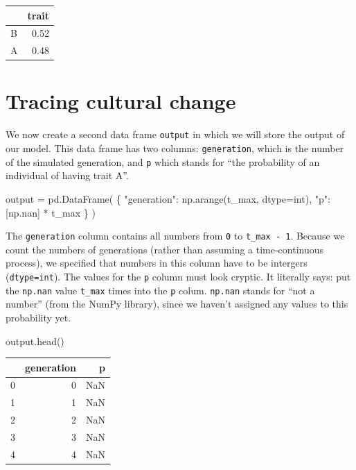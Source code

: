 \documentclass[
  a4paperpaper,
  ,captions=tableheading
]{scrbook}
\newenvironment{Shaded}{\begin{snugshade}}{\end{snugshade}}
\newcommand{\BuiltInTok}[1]{\textcolor[rgb]{0.00,0.23,0.31}{#1}}
\newcommand{\NormalTok}[1]{\textcolor[rgb]{0.00,0.23,0.31}{#1}}
\newcommand{\OperatorTok}[1]{\textcolor[rgb]{0.37,0.37,0.37}{#1}}
\newcommand{\StringTok}[1]{\textcolor[rgb]{0.13,0.47,0.30}{#1}}
\begin{document}
\begin{tabular}{lr}
\toprule
{} &  trait \\
\midrule
B &   0.52 \\
A &   0.48 \\
\bottomrule
\end{tabular}

\hypertarget{tracing-cultural-change}{%
\section{Tracing cultural change}\label{tracing-cultural-change}}

We now create a second data frame \texttt{output} in which we will store
the output of our model. This data frame has two columns:
\texttt{generation}, which is the number of the simulated generation,
and \texttt{p} which stands for ``the probability of an individual of
having trait A''.

\begin{Shaded}
\begin{Highlighting}[]
\NormalTok{output }\OperatorTok{=}\NormalTok{ pd.DataFrame(}
\NormalTok{    \{}
        \StringTok{"generation"}\NormalTok{: np.arange(t\_max, dtype}\OperatorTok{=}\BuiltInTok{int}\NormalTok{), }
        \StringTok{"p"}\NormalTok{: [np.nan] }\OperatorTok{*}\NormalTok{ t\_max }
\NormalTok{    \}}
\NormalTok{)}
\end{Highlighting}
\end{Shaded}

The \texttt{generation} column contains all numbers from \texttt{0} to
\texttt{t\_max\ -\ 1}. Because we count the numbers of generations
(rather than assuming a time-continuous process), we specified that
numbers in this column have to be intergers (\texttt{dtype=int}). The
values for the \texttt{p} column must look cryptic. It literally says:
put the \texttt{np.nan} value \texttt{t\_max} times into the \texttt{p}
colum. \texttt{np.nan} stands for ``not a number'' (from the NumPy
library), since we haven't assigned any values to this probability yet.

\begin{Shaded}
\begin{Highlighting}[]
\NormalTok{output.head()}
\end{Highlighting}
\end{Shaded}

\begin{tabular}{lrr}
\toprule
{} &  generation &   p \\
\midrule
0 &           0 & NaN \\
1 &           1 & NaN \\
2 &           2 & NaN \\
3 &           3 & NaN \\
4 &           4 & NaN \\
\bottomrule
\end{tabular}
\end{document}
